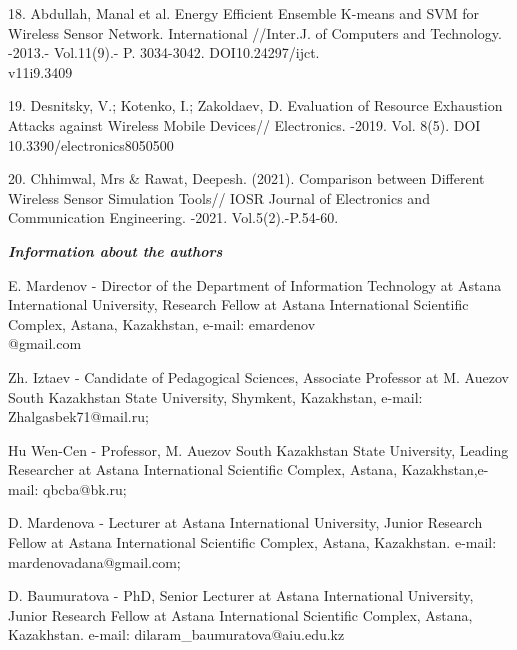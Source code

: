 \begin{noparindent}
18. Abdullah, Manal et al. Energy Efficient Ensemble K-means and SVM for
Wireless Sensor Network. International //Inter.J. of Computers and
Technology. -2013.- Vol.11(9).- P. 3034-3042. DOI10.24297/ijct.\\v11i9.3409

19. Desnitsky, V.; Kotenko, I.; Zakoldaev, D. Evaluation of Resource
Exhaustion Attacks against Wireless Mobile Devices// Electronics. -2019.
Vol. 8(5). DOI 10.3390/electronics8050500

20. Chhimwal, Mrs \& Rawat, Deepesh. (2021). Comparison between
Different Wireless Sensor Simulation Tools// IOSR Journal of Electronics
and Communication Engineering. -2021. Vol.5(2).-P.54-60.
\end{noparindent}

\emph{{\bfseries Information about the authors}}
\begin{noparindent}

E. Mardenov - Director of the Department of Information Technology at
Astana International University, Research Fellow at Astana International
Scientific Complex, Astana, Kazakhstan, e-mail: emardenov\\@gmail.com

Zh. Iztaev - Candidate of Pedagogical Sciences, Associate Professor at
M. Auezov South Kazakhstan State University, Shymkent, Kazakhstan,
e-mail: Zhalgasbek71@mail.ru;

Hu Wen-Cen - Professor, M. Auezov South Kazakhstan State University,
Leading Researcher at Astana International Scientific Complex, Astana,
Kazakhstan,e-mail: qbcba@bk.ru;

D. Mardenova - Lecturer at Astana International University, Junior
Research Fellow at Astana International Scientific Complex, Astana,
Kazakhstan. e-mail: mardenovadana@gmail.com;

D. Baumuratova - PhD, Senior Lecturer at Astana International
University, Junior Research Fellow at Astana International Scientific
Complex, Astana, Kazakhstan. e-mail: dilaram\_baumuratova@aiu.edu.kz
\end{noparindent}

